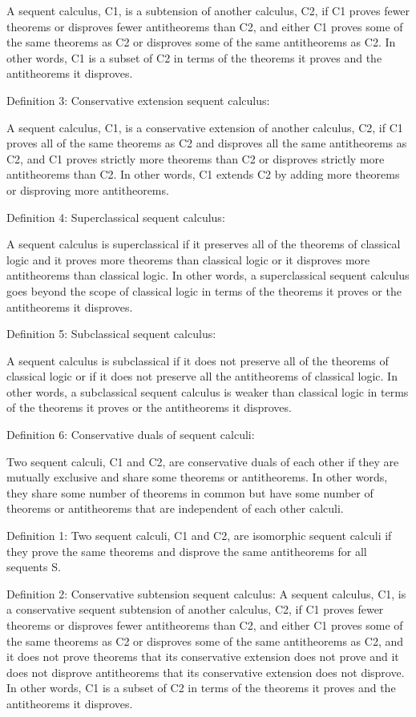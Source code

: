 A sequent calculus, C1, is a subtension of another calculus, C2, if C1 proves fewer theorems or disproves fewer antitheorems than C2, and either C1 proves some of the same theorems as C2 or disproves some of the same antitheorems as C2. In other words, C1 is a subset of C2 in terms of the theorems it proves and the antitheorems it disproves.

Definition 3: Conservative extension sequent calculus:

A sequent calculus, C1, is a conservative extension of another calculus, C2, if C1 proves all of the same theorems as C2 and disproves all the same antitheorems as C2, and C1 proves strictly more theorems than C2 or disproves strictly more antitheorems than C2. In other words, C1 extends C2 by adding more theorems or disproving more antitheorems.

Definition 4: Superclassical sequent calculus:

A sequent calculus is superclassical if it preserves all of the theorems of classical logic and it proves more theorems than classical logic or it disproves more antitheorems than classical logic. In other words, a superclassical sequent calculus goes beyond the scope of classical logic in terms of the theorems it proves or the antitheorems it disproves.

Definition 5: Subclassical sequent calculus:

A sequent calculus is subclassical if it does not preserve all of the theorems of classical logic or if it does not preserve all the antitheorems of classical logic. In other words, a subclassical sequent calculus is weaker than classical logic in terms of the theorems it proves or the antitheorems it disproves.

Definition 6: Conservative duals of sequent calculi:

Two sequent calculi, C1 and C2, are conservative duals of each other if they are mutually exclusive and share some theorems or antitheorems. In other words, they share some number of theorems in common but have some number of theorems or antitheorems that are independent of each other calculi.

Definition 1:
Two sequent calculi, C1 and C2, are isomorphic sequent calculi if they prove the same theorems and disprove the same antitheorems for all sequents S.

Definition 2: Conservative subtension sequent calculus:
A sequent calculus, C1, is a conservative sequent subtension of another calculus, C2, if C1 proves fewer theorems or disproves fewer antitheorems than C2, and either C1 proves some of the same theorems as C2 or disproves some of the same antitheorems as C2, and it does not prove theorems that its conservative extension does not prove and it does not disprove antitheorems that its conservative extension does not disprove. In other words, C1 is a subset of C2 in terms of the theorems it proves and the antitheorems it disproves.

